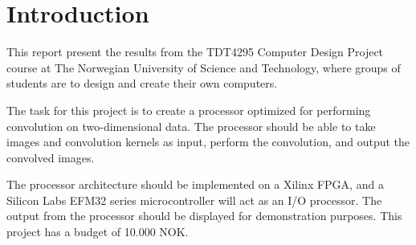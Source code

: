 \chapter{Introduction}
This report present the results from the TDT4295 Computer Design Project course at The Norwegian University of Science and Technology, where groups of students are to design and create their own computers.

The task for this project is to create a processor optimized for performing convolution on two-dimensional data. The processor should be able to take images and convolution kernels as input, perform the convolution, and output the convolved images.

The processor architecture should be implemented on a Xilinx FPGA, and a Silicon Labs EFM32 series microcontroller will act as an I/O processor. The output from the processor should be displayed for demonstration purposes. This project has a budget of 10.000 NOK.




